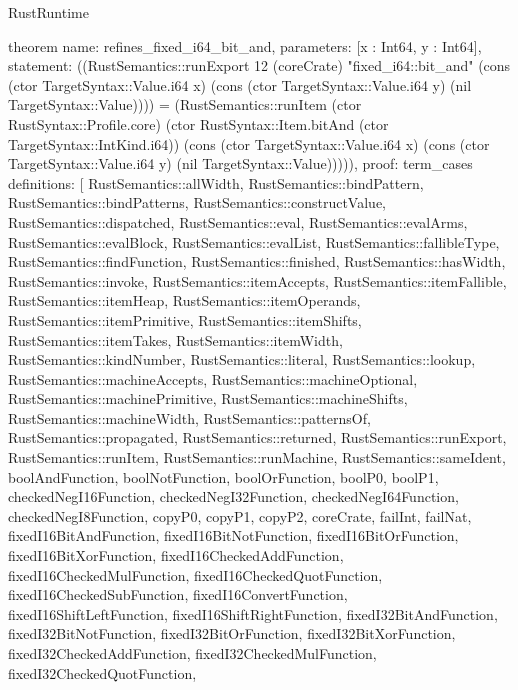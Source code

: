 \begin{lexlean}{RustRuntime}
\begin{semanticmodule}
theorem{
  name: refines_fixed_i64_bit_and,
  parameters: [x : Int64, y : Int64],
  statement: ((RustSemantics::runExport 12 (coreCrate) "fixed_i64::bit_and" (cons (ctor TargetSyntax::Value.i64 x) (cons (ctor TargetSyntax::Value.i64 y) (nil TargetSyntax::Value)))) = (RustSemantics::runItem (ctor RustSyntax::Profile.core) (ctor RustSyntax::Item.bitAnd (ctor TargetSyntax::IntKind.i64)) (cons (ctor TargetSyntax::Value.i64 x) (cons (ctor TargetSyntax::Value.i64 y) (nil TargetSyntax::Value))))),
  proof: term_cases{
    definitions: [
      RustSemantics::allWidth,
      RustSemantics::bindPattern,
      RustSemantics::bindPatterns,
      RustSemantics::constructValue,
      RustSemantics::dispatched,
      RustSemantics::eval,
      RustSemantics::evalArms,
      RustSemantics::evalBlock,
      RustSemantics::evalList,
      RustSemantics::fallibleType,
      RustSemantics::findFunction,
      RustSemantics::finished,
      RustSemantics::hasWidth,
      RustSemantics::invoke,
      RustSemantics::itemAccepts,
      RustSemantics::itemFallible,
      RustSemantics::itemHeap,
      RustSemantics::itemOperands,
      RustSemantics::itemPrimitive,
      RustSemantics::itemShifts,
      RustSemantics::itemTakes,
      RustSemantics::itemWidth,
      RustSemantics::kindNumber,
      RustSemantics::literal,
      RustSemantics::lookup,
      RustSemantics::machineAccepts,
      RustSemantics::machineOptional,
      RustSemantics::machinePrimitive,
      RustSemantics::machineShifts,
      RustSemantics::machineWidth,
      RustSemantics::patternsOf,
      RustSemantics::propagated,
      RustSemantics::returned,
      RustSemantics::runExport,
      RustSemantics::runItem,
      RustSemantics::runMachine,
      RustSemantics::sameIdent,
      boolAndFunction,
      boolNotFunction,
      boolOrFunction,
      boolP0,
      boolP1,
      checkedNegI16Function,
      checkedNegI32Function,
      checkedNegI64Function,
      checkedNegI8Function,
      copyP0,
      copyP1,
      copyP2,
      coreCrate,
      failInt,
      failNat,
      fixedI16BitAndFunction,
      fixedI16BitNotFunction,
      fixedI16BitOrFunction,
      fixedI16BitXorFunction,
      fixedI16CheckedAddFunction,
      fixedI16CheckedMulFunction,
      fixedI16CheckedQuotFunction,
      fixedI16CheckedSubFunction,
      fixedI16ConvertFunction,
      fixedI16ShiftLeftFunction,
      fixedI16ShiftRightFunction,
      fixedI32BitAndFunction,
      fixedI32BitNotFunction,
      fixedI32BitOrFunction,
      fixedI32BitXorFunction,
      fixedI32CheckedAddFunction,
      fixedI32CheckedMulFunction,
      fixedI32CheckedQuotFunction,
}}
\end{semanticmodule}
\end{lexlean}
